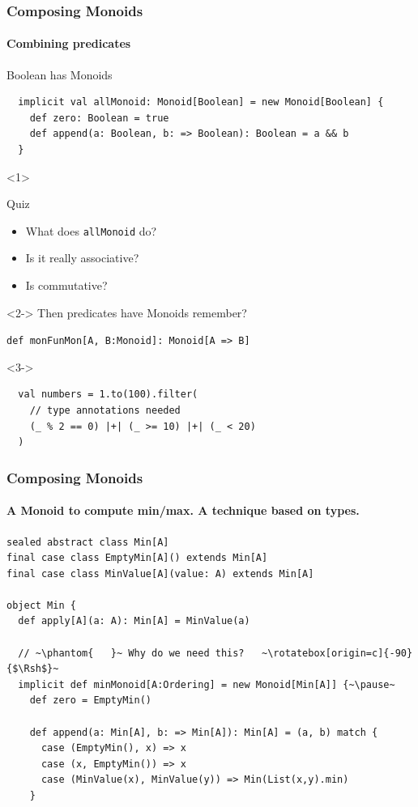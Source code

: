 \documentclass{beamer}
\begin{document}
\begin{frame}[fragile]
  \frametitle{Composing Monoids}
  \framesubtitle{Combining predicates}
  \begin{block}{Boolean has Monoids}
  \begin{lstlisting}
  implicit val allMonoid: Monoid[Boolean] = new Monoid[Boolean] {
    def zero: Boolean = true
    def append(a: Boolean, b: => Boolean): Boolean = a && b
  }
  \end{lstlisting}
  \end{block}

  \begin{onlyenv}<1>
  \begin{block}{Quiz}
    \begin{itemize}
      \item What does \texttt{allMonoid} do?
      \item Is it really associative?
      \item Is commutative?
    \end{itemize}
  \end{block}
  \end{onlyenv}

  \begin{onlyenv}<2->
    Then predicates have Monoids remember?

    \texttt{def monFunMon[A, B:Monoid]: Monoid[A => B]}
  \end{onlyenv}

  \begin{onlyenv}<3->
  \begin{block}{}
  \begin{lstlisting}
  val numbers = 1.to(100).filter(
    // type annotations needed
    (_ % 2 == 0) |+| (_ >= 10) |+| (_ < 20)
  )
  \end{lstlisting}
  \end{block}
  \end{onlyenv}
\end{frame}

\begin{frame}[fragile]
  \frametitle{Composing Monoids}
  \framesubtitle{A Monoid to compute min/max. A technique based on types.}
  \begin{block}{}
  \begin{lstlisting}
sealed abstract class Min[A]
final case class EmptyMin[A]() extends Min[A]
final case class MinValue[A](value: A) extends Min[A]

object Min {
  def apply[A](a: A): Min[A] = MinValue(a)

  // ~\phantom{   }~ Why do we need this?   ~\rotatebox[origin=c]{-90}{$\Rsh$}~
  implicit def minMonoid[A:Ordering] = new Monoid[Min[A]] {~\pause~
    def zero = EmptyMin()

    def append(a: Min[A], b: => Min[A]): Min[A] = (a, b) match {
      case (EmptyMin(), x) => x
      case (x, EmptyMin()) => x
      case (MinValue(x), MinValue(y)) => Min(List(x,y).min)
    }
  \end{lstlisting}
  \end{block}
\end{frame}
\end{document}
